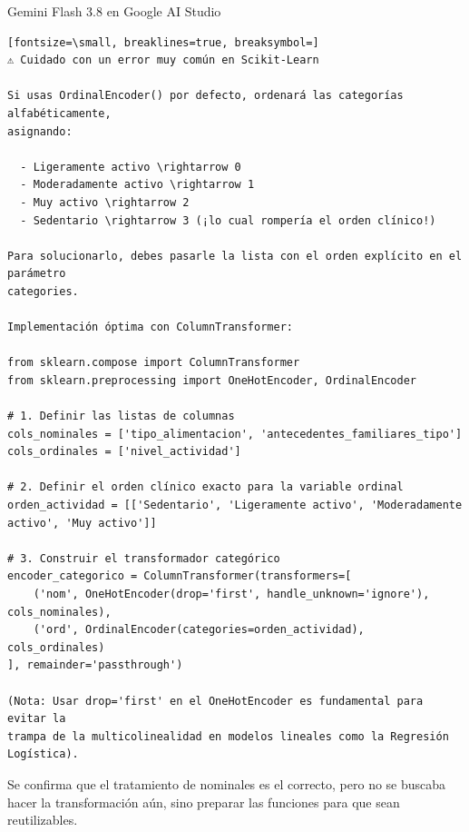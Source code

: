 \documentclass[12pt,a4paper,oneside]{book}
\begin{document}
\begin{iaresp}{Gemini Flash 3.8 en Google AI Studio}
\begin{Verbatim}[fontsize=\small, breaklines=true, breaksymbol=]
⚠️ Cuidado con un error muy común en Scikit-Learn

Si usas OrdinalEncoder() por defecto, ordenará las categorías alfabéticamente,
asignando:

  - Ligeramente activo \rightarrow 0
  - Moderadamente activo \rightarrow 1
  - Muy activo \rightarrow 2
  - Sedentario \rightarrow 3 (¡lo cual rompería el orden clínico!)

Para solucionarlo, debes pasarle la lista con el orden explícito en el parámetro
categories.

Implementación óptima con ColumnTransformer:

from sklearn.compose import ColumnTransformer
from sklearn.preprocessing import OneHotEncoder, OrdinalEncoder

# 1. Definir las listas de columnas
cols_nominales = ['tipo_alimentacion', 'antecedentes_familiares_tipo']
cols_ordinales = ['nivel_actividad']

# 2. Definir el orden clínico exacto para la variable ordinal
orden_actividad = [['Sedentario', 'Ligeramente activo', 'Moderadamente activo', 'Muy activo']]

# 3. Construir el transformador categórico
encoder_categorico = ColumnTransformer(transformers=[
    ('nom', OneHotEncoder(drop='first', handle_unknown='ignore'), cols_nominales),
    ('ord', OrdinalEncoder(categories=orden_actividad), cols_ordinales)
], remainder='passthrough')

(Nota: Usar drop='first' en el OneHotEncoder es fundamental para evitar la
trampa de la multicolinealidad en modelos lineales como la Regresión Logística).

\end{Verbatim}
\end{iaresp}
\begin{iaanalisis}
Se confirma que el tratamiento de nominales es el correcto, pero no se buscaba hacer la transformación aún, sino preparar las funciones para que sean reutilizables.
\end{iaanalisis}
\end{document}
